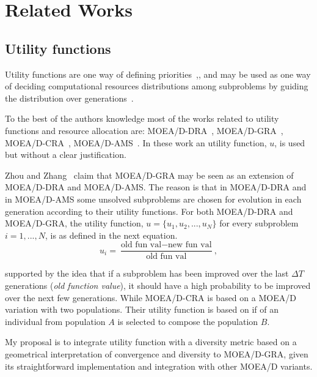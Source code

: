 \section{Related Works}

\subsection{Utility functions}


Utility functions are one way of defining priorities~\cite{chankong1983multiobjective},\cite{hansson2005decision},  and may be used as one way of deciding computational resources distributions among subproblems by guiding the distribution over generations~\cite{cai2015external}. 


To the best of the authors knowledge most of the works related to utility functions and resource allocation are: MOEA/D-DRA~\cite{zhang2009performance}, MOEA/D-GRA~\cite{zhou2016all}, MOEA/D-CRA~\cite{kang2018collaborative}, MOEA/D-AMS~\cite{chiang2011moea}. In these work an utility function, $u$, is used but without a clear justification. 

Zhou and Zhang~\cite{zhou2016all} claim that MOEA/D-GRA may be seen as an extension of MOEA/D-DRA and MOEA/D-AMS. The reason is that in MOEA/D-DRA and in MOEA/D-AMS some unsolved subproblems  are chosen for evolution in each generation according to their utility functions. For both MOEA/D-DRA and MOEA/D-GRA, the utility function, $u = \{u_1, u_2, ..., u_N\}$ for every subproblem $i=1,...,N$, is as defined in the next equation.
\begin{equation}\label{utility}
	u_i = \dfrac{\text{old fun val}-\text{new fun val}}{\text{old fun val}},
\end{equation}


supported by the idea that if a subproblem has been improved over the last $\Delta T$ generations (\textit{old function value}), it should have a high probability to be improved over the next few generations. While MOEA/D-CRA is based on a MOEA/D variation with two populations. Their utility function is based on if of an individual from population $A$ is selected to compose the population $B$.

My proposal is to integrate utility function with a diversity metric based on a geometrical interpretation of convergence and diversity to MOEA/D-GRA, given its straightforward implementation and integration with other MOEA/D variants.

%

